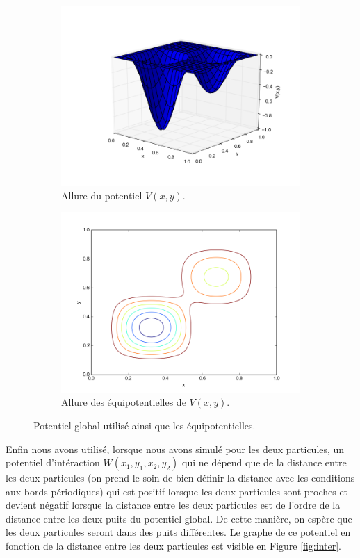 \documentclass[11pt]{article}
\theoremstyle{definition}
\theoremstyle{remark}
\begin{document}
\begin{figure}[h]
\centering
\begin{subfigure}{.5\textwidth}
	\centering
	\label{fig:pot}
	\includegraphics[width=10cm]{potentiel.png}
	\caption{Allure du potentiel $V(x,y)$.}
\end{subfigure}%
\begin{subfigure}{.5\textwidth}
	\centering	
	\label{fig:equipot}
	\includegraphics[width=10cm]{equipot.png}
	\caption{Allure des équipotentielles de $V(x,y)$.}
\end{subfigure}
\caption{Potentiel global utilisé ainsi que les équipotentielles.}\label{fig:potentiels}
\end{figure}

Enfin nous avons utilisé, lorsque nous avons simulé pour les deux particules, un potentiel d'intéraction $W(x_1,y_1,x_2,y_2)$ qui ne dépend que de la distance entre les deux particules (on prend le soin de bien définir la distance avec les conditions aux bords périodiques) qui est positif lorsque les deux particules sont proches et devient négatif lorsque la distance entre les deux particules est de l'ordre de la distance entre les deux puits du potentiel global. De cette manière, on espère que les deux particules seront dans des puits différentes. Le graphe de ce potentiel en fonction de la distance entre les deux particules est visible en Figure \ref{fig:inter}.
\end{document}

